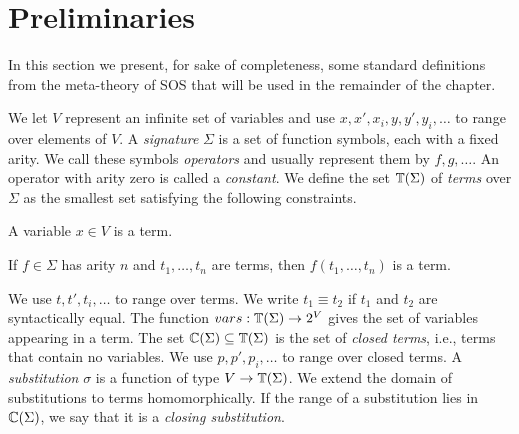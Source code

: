 \section{\label{sec::pre}Preliminaries}

In this section we present, for sake of completeness, some standard definitions from
the meta-theory of SOS that will be used in the remainder of the chapter.

\begin{definition}
    We let $V$ represent an infinite set of variables and use $x,x',x_i,y,y',y_i,\dots$ to range over elements of $V$.
    A \emph{signature} $\Sigma$ is a set of function symbols, each with a fixed arity. We call these symbols
    \emph{operators} and usually represent them by $f,g,\dots$. An operator with arity zero is called a
    \emph{constant}. We define the set $\mathbb{T}(\Sigma)$ of \emph{terms} over $\Sigma$ as the smallest set satisfying the following constraints.
    \begin{bullets}
        \item A variable $x\in V$ is a term.
        \item If $f\in \Sigma$ has arity $n$ and $t_1,\dots,t_n$ are terms, then $f(t_1,\dots,t_n)$ is a term.
    \end{bullets}
    We use $t,t',t_i,\dots$ to range over terms. We write $t_1 \equiv t_2$ if $t_1$ and $t_2$ are syntactically equal.
    The function $vars : \mathbb{T}(\Sigma) \rightarrow 2^V$ gives the set of variables appearing in a term.
    The set $\mathbb{C}(\Sigma) \subseteq \mathbb{T}(\Sigma)$ is the set of \emph{closed terms}, i.e., terms that contain no variables.
    We use $p,p',p_i,\dots$ to range over closed terms.
    A \emph{substitution} $\sigma$ is a function of type $V \rightarrow \mathbb{T}(\Sigma)$. We extend the domain of substitutions to terms
    homomorphically. If the range of a substitution lies in $\mathbb{C}(\Sigma)$, we say that it is a \emph{closing substitution}.
\end{definition}

